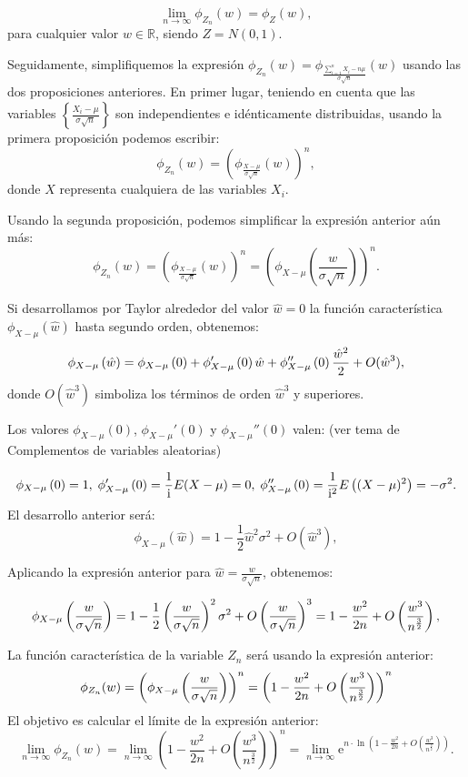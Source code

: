 \documentclass[
  letterpaper,
  DIV=11,
  numbers=noendperiod]{scrreprt}
\begin{document}
\[
\lim_{n\to \infty}\phi_{Z_n}(w)=\phi_Z(w),
\] para cualquier valor \(w\in\mathbb{R}\), siendo \(Z=N(0,1)\).

Seguidamente, simplifiquemos la expresión
\(\phi_{Z_n}(w)=\phi_{\frac{\sum\limits_{i=1}^n X_i-n\mu}{\sigma\sqrt{n}}}(w)\)
usando las dos proposiciones anteriores. En primer lugar, teniendo en
cuenta que las variables
\(\left\{\frac{X_i-\mu}{\sigma\sqrt{n}}\right\}\) son independientes e
idénticamente distribuidas, usando la primera proposición podemos
escribir: \[
\phi_{Z_n}(w) = \left(\phi_{\frac{X-\mu}{\sigma\sqrt{n}}}(w)\right)^n,
\] donde \(X\) representa cualquiera de las variables \(X_i\).

Usando la segunda proposición, podemos simplificar la expresión anterior
aún más: \[
\phi_{Z_n}(w) = \left(\phi_{\frac{X-\mu}{\sigma\sqrt{n}}}(w)\right)^n = \left(\phi_{X-\mu}\left(\frac{w}{\sigma\sqrt{n}}\right)\right)^n.
\]

Si desarrollamos por Taylor alrededor del valor \(\hat{w}=0\) la función
característica \(\phi_{X-\mu}\left(\hat{w}\right)\) hasta segundo orden,
obtenemos: \[
\scriptsize{
\phi_{X-\mu}\left(\hat{w}\right) = \phi_{X-\mu}\left(0\right)+ \phi_{X-\mu}'\left(0\right) \hat{w}+ \phi_{X-\mu}''\left(0\right)\frac{\hat{w}^2}{2}+O(\hat{w}^3),
}
\] donde \(O(\hat{w}^3)\) simboliza los términos de orden \(\hat{w}^3\)
y superiores.

Los valores \(\phi_{X-\mu}\left(0\right)\),
\(\phi_{X-\mu}'\left(0\right)\) y \(\phi_{X-\mu}''\left(0\right)\)
valen: (ver tema de Complementos de variables aleatorias)

\[
\scriptsize{
\phi_{X-\mu}\left(0\right)=1, \ \phi_{X-\mu}'\left(0\right)=\frac{1}{\mathrm{i}}E(X-\mu)=0,\ \phi_{X-\mu}''\left(0\right)=\frac{1}{\mathrm{i}^2}E\left((X-\mu)^2\right)=-\sigma^2.
}
\] El desarrollo anterior será: \[
\phi_{X-\mu}\left(\hat{w}\right) =1 - \frac{1}{2}\hat{w}^2\sigma^2+O(\hat{w}^3),
\]

Aplicando la expresión anterior para
\(\hat{w}=\frac{w}{\sigma\sqrt{n}}\), obtenemos:

\[
\scriptsize{
\phi_{X-\mu}\left(\frac{w}{\sigma\sqrt{n}}\right) =1 - \frac{1}{2}\left(\frac{w}{\sigma\sqrt{n}}\right)^2\sigma^2+O\left(\frac{w}{\sigma\sqrt{n}}\right)^3= 1-\frac{w^2}{2n}+O\left(\frac{w^3}{n^{\frac{3}{2}}}\right),
}
\]

La función característica de la variable \(Z_n\) será usando la
expresión anterior: \[
\scriptsize{\phi_{Z_n}(w)=\left(\phi_{X-\mu}\left(\frac{w}{\sigma\sqrt{n}}\right)\right)^n = \left(1-\frac{w^2}{2n}+O\left(\frac{w^3}{n^{\frac{3}{2}}}\right)\right)^n}
\] El objetivo es calcular el límite de la expresión anterior: \[
\lim_{n\to \infty}\phi_{Z_n}(w) = \lim_{n\to\infty} \left(1-\frac{w^2}{2n}+O\left(\frac{w^3}{n^{\frac{3}{2}}}\right)\right)^n = 
\lim_{n\to \infty}\mathrm{e}^{n\cdot \ln \left(1-\frac{w^2}{2n}+O\left(\frac{w^3}{n^{\frac{3}{2}}}\right)\right)}.
\]
\end{document}
